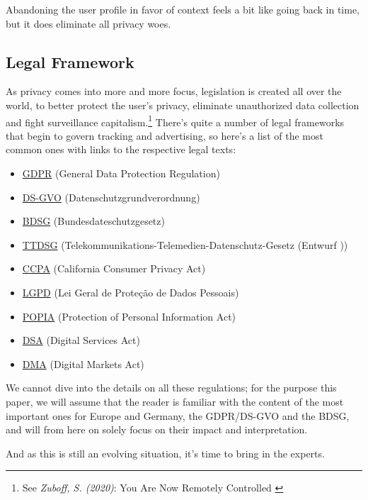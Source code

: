 Abandoning the user profile in favor of context feels a bit like going back in time, but it does eliminate all privacy woes.

\subsection{Legal Framework}

As privacy comes into more and more focus, legislation is created all over the world, to better protect the user's privacy, eliminate unauthorized data collection and fight surveillance capitalism.\footnote{See \textit{Zuboff, S. (2020)}: You Are Now Remotely Controlled \cite{surveillance}} There's quite a number of legal frameworks that begin to govern tracking and advertising, so here's a list of the most common ones with links to the respective legal texts:

\begin{itemize}
 \item \href{https://gdpr-info.eu/}{GDPR} (General Data Protection Regulation)
 \item \href{https://www.datenschutz-grundverordnung.eu/}{DS-GVO} (Datenschutzgrundverordnung)
 \item \href{https://dsgvo-gesetz.de/bdsg/}{BDSG} (Bundesdateschutzgesetz)
 \item \href{https://dsgvo-gesetz.de/ttdsg/}{TTDSG} (Telekommunikations-Telemedien-Datenschutz-Gesetz (Entwurf ))
 \item \href{https://oag.ca.gov/privacy/ccpa}{CCPA} (California Consumer Privacy Act)
 \item \href{https://www.lgpdbrasil.com.br/}{LGPD} (Lei Geral de Proteção de Dados Pessoais)
 \item \href{https://popia.co.za/}{POPIA} (Protection of Personal Information Act)
 \item \href{https://ec.europa.eu/info/strategy/priorities-2019-2024/europe-fit-digital-age/digital-services-act-ensuring-safe-and-accountable-online-environment_en}{DSA} (Digital Services Act)
 \item \href{https://ec.europa.eu/info/strategy/priorities-2019-2024/europe-fit-digital-age/digital-markets-act-ensuring-fair-and-open-digital-markets_en}{DMA} (Digital Markets Act)
\end{itemize}

We cannot dive into the details on all these regulations; for the purpose this paper, we will assume that the reader is familiar with the content of the most important ones for Europe and Germany, the GDPR/DS-GVO and the BDSG, and will from here on solely focus on their impact and interpretation.

And as this is still an evolving situation, it's time to bring in the experts.
